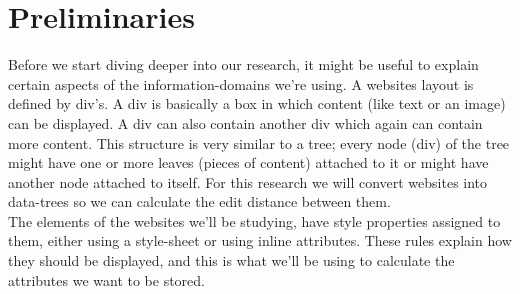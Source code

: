 \chapter{Preliminaries}\label{preliminaries}
Before we start diving deeper into our research, it might be useful to explain certain aspects of the information-domains we're using.
A websites layout is defined by div's. A div is basically a box in which content (like text or an image) can be displayed. A div can also contain another div which again can contain more content. This structure is very similar to a tree; every node (div) of the tree might have one or more leaves (pieces of content) attached to it or might have another node attached to itself. For this research we will convert websites into data-trees so we can calculate the edit distance between them.\\
The elements of the websites we'll be studying, have style properties assigned to them, either using a style-sheet or using inline attributes. These rules explain how they should be displayed, and this is what we'll be using to calculate the attributes we want to be stored.
